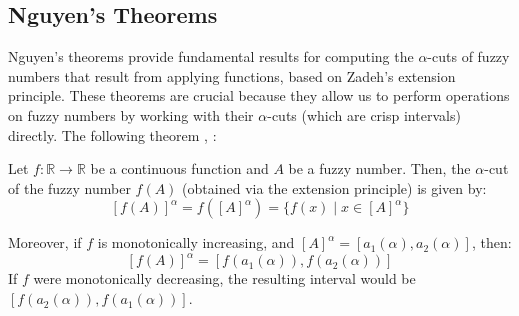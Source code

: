 







\subsection{Nguyen's Theorems}
Nguyen's theorems provide fundamental results for computing the $\alpha$-cuts of fuzzy numbers that result from applying functions, based on Zadeh's extension principle. These theorems are crucial because they allow us to perform operations on fuzzy numbers by working with their $\alpha$-cuts (which are crisp intervals) directly. The following theorem \cite[Thm. 1.3.1, p. 17]{FULLER2}, \cite{NGUYEN1978}:

\begin{theorem}
    Let $f: \mathbb{R} \to \mathbb{R}$ be a continuous function and $A$ be a fuzzy number. Then, the $\alpha$-cut of the fuzzy number $f(A)$ (obtained via the extension principle) is given by:
    \[
    [f(A)]^{\alpha} = f([A]^{\alpha}) = \{f(x) \mid x \in [A]^\alpha\}
    \]

    Moreover, if $f$ is monotonically increasing, and $[A]^\alpha = [a_1(\alpha), a_2(\alpha)]$, then:
    \[
    [f(A)]^{\alpha} = [f(a_1(\alpha)), f(a_2(\alpha))]
    \]
    If $f$ were monotonically decreasing, the resulting interval would be $[f(a_2(\alpha)), f(a_1(\alpha))]$.
\end{theorem}

